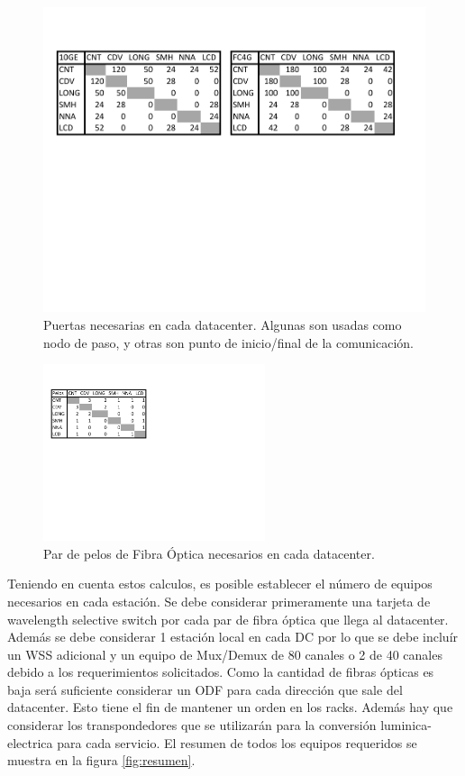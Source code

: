 \begin{figure}[H]
  \centering
  \includegraphics[width=13cm]{Imagenes/puertas.pdf}
  \caption[Puertas de cada DataCenter]{Puertas necesarias en cada datacenter. Algunas son usadas como nodo de paso, y otras son punto de inicio/final de la comunicación.}
  \label{fig:puertas}
\end{figure}

\begin{figure}[H]
  \centering
  \includegraphics[width=6.5cm]{Imagenes/pelos.pdf}
  \caption[Fibras de cada DataCenter]{Par de pelos de Fibra Óptica necesarios en cada datacenter.}
  \label{fig:pelos}
\end{figure}

Teniendo en cuenta estos calculos, es posible establecer el número de equipos necesarios en cada estación. Se debe considerar primeramente una tarjeta de wavelength selective switch por cada par de fibra óptica que llega al datacenter. Además se debe considerar 1 estación local en cada DC por lo que se debe incluír un WSS adicional y un equipo de Mux/Demux de 80 canales o 2 de 40 canales debido a los requerimientos solicitados. Como la cantidad de fibras ópticas es baja será suficiente considerar un ODF para cada dirección que sale del datacenter. Esto tiene el fin de mantener un orden en los racks. Además hay que considerar los transpondedores que se utilizarán para la conversión luminica-electrica para cada servicio. El resumen de todos los equipos requeridos se muestra en la figura \ref{fig:resumen}.

